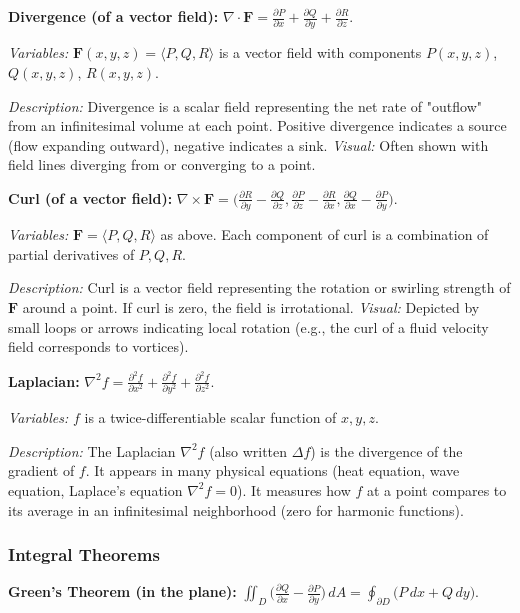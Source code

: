 \documentclass{article}
\begin{document}
\textbf{Divergence (of a vector field):} $\displaystyle \nabla\cdot \mathbf{F} = \frac{\partial P}{\partial x} + \frac{\partial Q}{\partial y} + \frac{\partial R}{\partial z}$.

\textit{Variables:} $\mathbf{F}(x,y,z) = \langle P, Q, R\rangle$ is a vector field with components $P(x,y,z)$, $Q(x,y,z)$, $R(x,y,z)$.

\textit{Description:} Divergence is a scalar field representing the net rate of "outflow" from an infinitesimal volume at each point. Positive divergence indicates a source (flow expanding outward), negative indicates a sink. \textit{Visual:} Often shown with field lines diverging from or converging to a point.

\textbf{Curl (of a vector field):} $\displaystyle \nabla \times \mathbf{F} = \Big(\frac{\partial R}{\partial y} - \frac{\partial Q}{\partial z}, \frac{\partial P}{\partial z} - \frac{\partial R}{\partial x}, \frac{\partial Q}{\partial x} - \frac{\partial P}{\partial y}\Big)$.

\textit{Variables:} $\mathbf{F} = \langle P, Q, R\rangle$ as above. Each component of curl is a combination of partial derivatives of $P, Q, R$.

\textit{Description:} Curl is a vector field representing the rotation or swirling strength of $\mathbf{F}$ around a point. If curl is zero, the field is irrotational. \textit{Visual:} Depicted by small loops or arrows indicating local rotation (e.g., the curl of a fluid velocity field corresponds to vortices).

\textbf{Laplacian:} $\displaystyle \nabla^2 f = \frac{\partial^2 f}{\partial x^2} + \frac{\partial^2 f}{\partial y^2} + \frac{\partial^2 f}{\partial z^2}$.

\textit{Variables:} $f$ is a twice-differentiable scalar function of $x,y,z$.

\textit{Description:} The Laplacian $\nabla^2 f$ (also written $\Delta f$) is the divergence of the gradient of $f$. It appears in many physical equations (heat equation, wave equation, Laplace's equation $\nabla^2 f=0$). It measures how $f$ at a point compares to its average in an infinitesimal neighborhood (zero for harmonic functions).

\subsubsection*{Integral Theorems}

\textbf{Green’s Theorem (in the plane):} $\displaystyle \iint_{D}\Big(\frac{\partial Q}{\partial x} - \frac{\partial P}{\partial y}\Big)\,dA = \oint_{\partial D} \big(P\,dx + Q\,dy\big)$.
\end{document}

